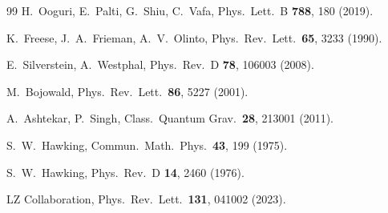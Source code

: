 \documentclass[epj]{svjour}
\begin{document}
\begin{thebibliography}{99}
H.~Ooguri, E.~Palti, G.~Shiu, C.~Vafa,
Phys.\ Lett.\ B \textbf{788}, 180 (2019).

K.~Freese, J.~A.~Frieman, A.~V.~Olinto,
Phys.\ Rev.\ Lett.\ \textbf{65}, 3233 (1990).

E.~Silverstein, A.~Westphal,
Phys.\ Rev.\ D \textbf{78}, 106003 (2008).


M.~Bojowald,
Phys.\ Rev.\ Lett.\ \textbf{86}, 5227 (2001).

A.~Ashtekar, P.~Singh,
Class.\ Quantum Grav.\ \textbf{28}, 213001 (2011).


S.~W.~Hawking,
Commun.\ Math.\ Phys.\ \textbf{43}, 199 (1975).

S.~W.~Hawking,
Phys.\ Rev.\ D \textbf{14}, 2460 (1976).


LZ Collaboration,
Phys.\ Rev.\ Lett.\ \textbf{131}, 041002 (2023).

\end{thebibliography}
\end{document}
